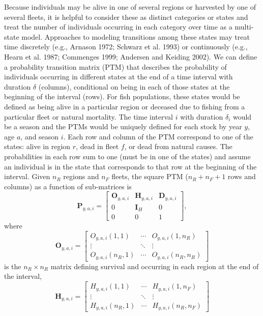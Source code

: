 \documentclass[
]{article}
\begin{document}
Because individuals may be alive in one of several regions or harvested by one of several fleets, it is helpful to consider these as distinct categories or states and treat the number of individuals occurring in each category over time as a multi-state model. Approaches to modeling transitions among these states may treat time discretely (e.g., Arnason 1972; Schwarz et al. 1993) or continuously (e.g., Hearn et al. 1987; Commenges 1999; Andersen and Keiding 2002). We can define a probability transition matrix (PTM) that describes the probability of individuals occurring in different states at the end of a time interval with duration \(\delta\) (columns), conditional on being in each of those states at the beginning of the interval (rows). For fish populations, these states would be defined as being alive in a particular region or deceased due to fishing from a particular fleet or natural mortality. The time interval \(i\) with duration \(\delta_i\) would be a season and the PTMs would be uniquely defined for each stock by year \(y\), age \(a\), and season \(i\). Each row and column of the PTM correspond to one of the states: alive in region \(r\), dead in fleet \(f\), or dead from natural causes. The probabilities in each row sum to one (must be in one of the states) and assume an individual is in the state that corresponds to that row at the beginning of the interval. Given \(n_R\) regions and \(n_F\) fleets, the square PTM (\(n_R + n_F + 1\) rows and columns) as a function of sub-matrices is
\begin{equation}\label{eq:ptm}
  \mathbf{P}_{y,a,i} = \begin{bmatrix}
    \mathbf{O}_{y,a,i} & \mathbf{H}_{y,a,i} & \mathbf{D}_{y,a,i} \\
    0 & \mathbf{I}_{H} & 0\\
    0 & 0 & 1
  \end{bmatrix},
\end{equation}
where
\begin{equation*}
  \mathbf{O}_{y,a,i} = 
  \begin{bmatrix}
    O_{y,a,i}(1,1) & \cdots & O_{y,a,i}(1,n_R) \\
    \vdots & \ddots & \vdots \\
    O_{y,a,i}(n_R,1) & \cdots & O_{y,a,i}(n_R,n_R)
  \end{bmatrix}
\end{equation*}
is the \(n_R \times n_R\) matrix defining survival and occurring in each region at the end of the interval,
\begin{equation*} 
  \mathbf{H}_{y,a,i} = 
  \begin{bmatrix}
    H_{y,a,i}(1,1) & \cdots & H_{y,a,i}(1,n_F) \\
    \vdots & \ddots & \vdots \\
    H_{y,a,i}(n_R,1) & \cdots & H_{y,a,i}(n_R,n_F)
  \end{bmatrix}
\end{equation*}
\end{document}
